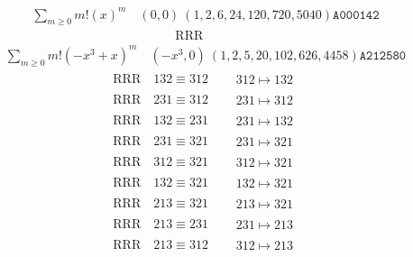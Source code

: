 \documentclass{article}
\begin{document}
$$
\begin{matrix}
\sum_{m \geq 0} m! \left(
x
\right)^m
\quad
\left(0, 0\right)
\ 
\left(1, 2, 6, 24, 120, 720, 5040\right)
\texttt{
A000142
}
\end{matrix}
$$
\begin{align}
\text{RRR}
\quad
&
\begin{matrix}
\end{matrix}
\end{align}
$$
\begin{matrix}
\sum_{m \geq 0} m! \left(
-x^{3} + x
\right)^m
\quad
\left(-x^{3}, 0\right)
\ 
\left(1, 2, 5, 20, 102, 626, 4458\right)
\texttt{
A212580
}
\end{matrix}
$$
\begin{align}
\text{RRR}
\quad
132\equiv312
\quad
&
\begin{matrix}
312 \mapsto 132
\end{matrix}
\\
\text{RRR}
\quad
231\equiv312
\quad
&
\begin{matrix}
231 \mapsto 312
\end{matrix}
\\
\text{RRR}
\quad
132\equiv231
\quad
&
\begin{matrix}
231 \mapsto 132
\end{matrix}
\\
\text{RRR}
\quad
231\equiv321
\quad
&
\begin{matrix}
231 \mapsto 321
\end{matrix}
\\
\text{RRR}
\quad
312\equiv321
\quad
&
\begin{matrix}
312 \mapsto 321
\end{matrix}
\\
\text{RRR}
\quad
132\equiv321
\quad
&
\begin{matrix}
132 \mapsto 321
\end{matrix}
\\
\text{RRR}
\quad
213\equiv321
\quad
&
\begin{matrix}
213 \mapsto 321
\end{matrix}
\\
\text{RRR}
\quad
213\equiv231
\quad
&
\begin{matrix}
231 \mapsto 213
\end{matrix}
\\
\text{RRR}
\quad
213\equiv312
\quad
&
\begin{matrix}
312 \mapsto 213
\end{matrix}
\\

\end{align}
\end{document}
